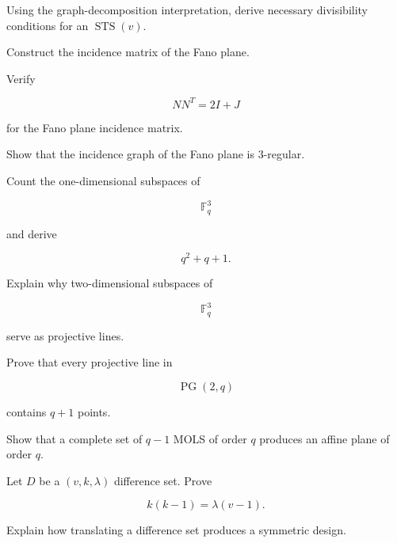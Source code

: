 \begin{exercise}[3]
Using the graph-decomposition interpretation, derive necessary
divisibility conditions for an \(\operatorname{STS}(v)\).
\end{exercise}

\begin{exercise}[3]
Construct the incidence matrix of the Fano plane.
\end{exercise}

\begin{exercise}[3]
Verify

\[
NN^T
=
2I+J
\]

for the Fano plane incidence matrix.
\end{exercise}

\begin{exercise}[3]
Show that the incidence graph of the Fano plane is \(3\)-regular.
\end{exercise}

\begin{exercise}[3]
Count the one-dimensional subspaces of

\[
\mathbb{F}_q^3
\]

and derive

\[
q^2+q+1.
\]
\end{exercise}

\begin{exercise}[3]
Explain why two-dimensional subspaces of

\[
\mathbb{F}_q^3
\]

serve as projective lines.
\end{exercise}

\begin{exercise}[3]
Prove that every projective line in

\[
\operatorname{PG}(2,q)
\]

contains \(q+1\) points.
\end{exercise}

\begin{exercise}[3]
Show that a complete set of \(q-1\) MOLS of order \(q\) produces an
affine plane of order \(q\).
\end{exercise}

\begin{exercise}[3]
Let \(D\) be a \((v,k,\lambda)\) difference set. Prove

\[
k(k-1)=\lambda(v-1).
\]
\end{exercise}

\begin{exercise}[3]
Explain how translating a difference set produces a symmetric design.
\end{exercise}

